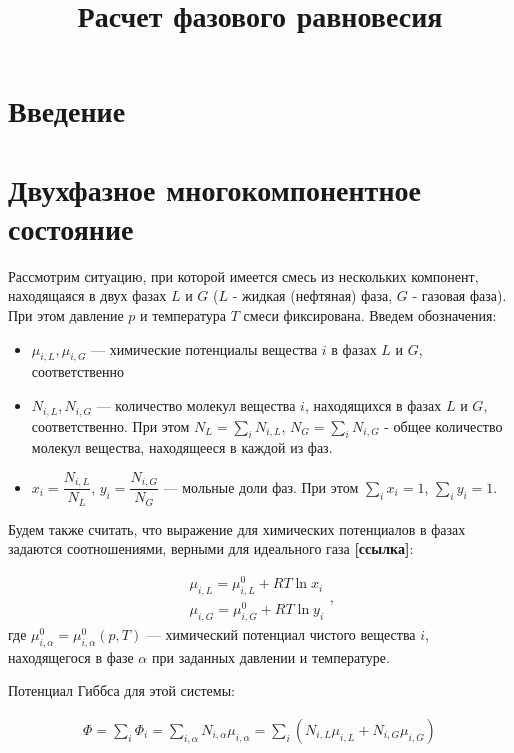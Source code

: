 \documentclass[12pt]{article}
\title{Расчет фазового равновесия}
\begin{document}
\maketitle

\section{Введение}

\section{Двухфазное многокомпонентное состояние}
Рассмотрим ситуацию, при которой имеется смесь из нескольких компонент,  находящаяся в двух фазах $L$ и $G$ ($L$ - жидкая (нефтяная) фаза, $G$ - газовая фаза). При этом давление $p$ и температура $T$ смеси фиксирована. Введем обозначения:
\begin{itemize}
\item $\mu_{i,L}, \mu_{i,G}$ --- химические потенциалы вещества  $i$ в фазах $L$ и $G$, соответственно
\item $N_{i,L}, N_{i,G}$ --- количество молекул вещества $i$, находящихся в фазах $L$ и $G$, соответственно. При этом $N_L = \sum_i N_{i,L}$, $N_G = \sum_i N_{i,G}$ - общее количество молекул вещества, находящееся в каждой из фаз.
\item $x_i = \dfrac{N_{i, L}}{N_L}$, $y_i = \dfrac{N_{i,G}}{N_G}$ --- мольные доли фаз. При этом $ \displaystyle \sum_i x_i = 1 $, $\displaystyle \sum_i y_i = 1 $.
\end{itemize}

Будем также считать, что выражение для химических потенциалов в фазах задаются соотношениями, верными для идеального газа \textbf{[ссылка]}:

\begin{equation}
\begin{aligned}
\mu_{i,L} = \mu_{i,L}^0 + RT \ln x_i \\
\mu_{i,G} = \mu_{i,G}^0 + RT \ln y_i
\end{aligned},
\label{eq:hid}
\end{equation}
где $\mu_{i,\alpha}^0 = \mu_{i,\alpha}^0(p, T)$ --- химический потенциал чистого вещества $i$, находящегося в фазе $\alpha$ при заданных давлении и температуре.

Потенциал Гиббса для этой системы:

\begin{equation}
\begin{aligned}
\Phi = \sum_i \Phi_i = \sum_{i, \alpha}{N_{i,\alpha} \mu_{i,\alpha}} = \sum_i \left(N_{i, L} \mu_{i, L} + N_{i, G} \mu_{i, G}\right)
\end{aligned}
\label{eq:gibbs}
\end{equation}
\end{document}
